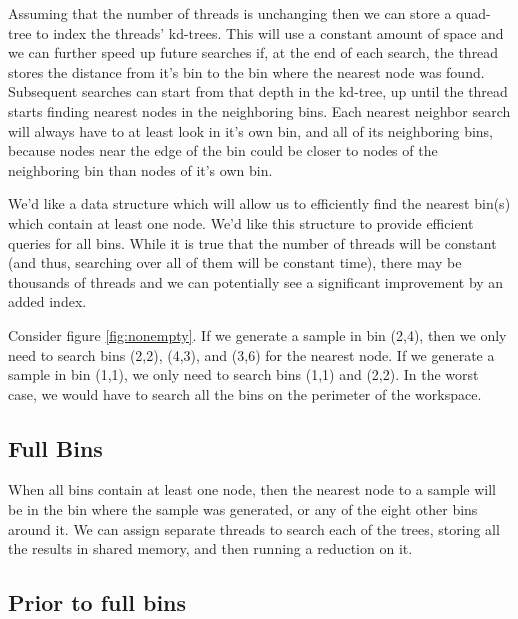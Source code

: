 Assuming that the number of threads is unchanging then we can store a quad-tree to index the threads' kd-trees. This will use a constant amount of space and we can further speed up future searches if, at the end of each search, the thread stores the distance from it's bin to the bin where the nearest node was found. Subsequent searches can start from that depth in the kd-tree, up until the thread starts finding nearest nodes in the neighboring bins. Each nearest neighbor search will always have to at least look in it's own bin, and all of its neighboring bins, because nodes near the edge of the bin could be closer to nodes of the neighboring bin than nodes of it's own bin.

\begin{figure}[H]
\begin{centering}
    \texttt{[image: \\figfile\{fig/nonempty\_search]}}
    \caption{Non-empty Search}
    \label{fig:nonempty}
\end{centering}
\end{figure}


We'd like a data structure which will allow us to efficiently find the nearest bin(s) which contain at least one node. We'd like this structure to provide efficient queries for all bins. While it is true that the number of threads will be constant (and thus, searching over all of them will be constant time), there may be thousands of threads and we can potentially see a significant improvement by an added index. 

Consider figure \ref{fig:nonempty}. If we generate a sample in bin (2,4), then we only need to search bins (2,2), (4,3), and (3,6) for the nearest node. If we generate a sample in bin (1,1), we only need to search bins (1,1) and (2,2). In the worst case, we would have to search all the bins on the perimeter of the workspace. 

\subsection{Full Bins}

When all bins contain at least one node, then the nearest node to a sample will be in the bin where the sample was generated, or any of the eight other bins around it. We can assign separate threads to search each of the trees, storing all the results in shared memory, and then running a reduction on it. 

\subsection{Prior to full bins}

